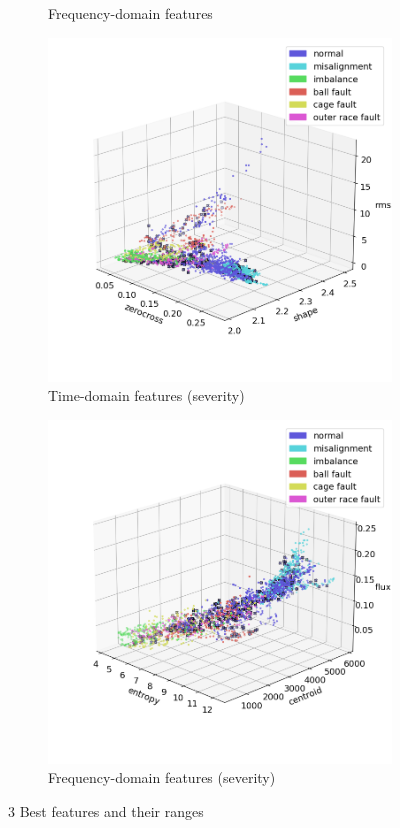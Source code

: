 \begin{figure}[ht]
\begin{subfigure}[b]{0.48\textwidth}
        \caption{Frequency-domain features}
    \end{subfigure}
    \hfill
    \begin{subfigure}[b]{0.48\textwidth}
        \includegraphics[width=\textwidth]{assets/results/labels/TD-severity.png}
        \caption{Time-domain features (severity)}
    \end{subfigure}
    \hfill
    \begin{subfigure}[b]{0.48\textwidth}
        \includegraphics[width=\textwidth]{assets/results/labels/FD-severity.png}
        \caption{Frequency-domain features (severity)}
    \end{subfigure} 
    \caption{3 Best features and their ranges}
\end{figure}

